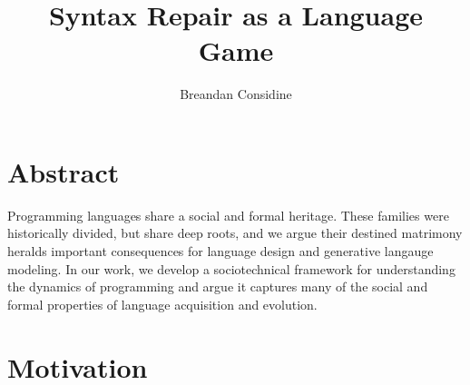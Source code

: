 \documentclass[sigplan,screen]{acmart}
\begin{document}
\title{Syntax Repair as a Language Game}

\author{Breandan Considine}

%


\renewcommand{\shortauthors}{Considine}


\maketitle

\section{Abstract}

Programming languages share a social and formal heritage. These families were historically divided, but share deep roots, and we argue their destined matrimony heralds important consequences for language design and generative langauge modeling. In our work, we develop a sociotechnical framework for understanding the dynamics of programming and argue it captures many of the social and formal properties of language acquisition and evolution.

\section{Motivation}

\end{document}
